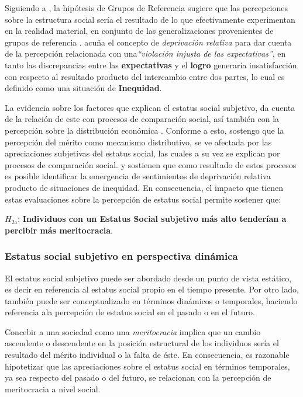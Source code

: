 \documentclass[12pt]{article}
\begin{document}
Siguiendo a \citet{Evans2004}, la hipótesis de Grupos de Referencia sugiere que las percepciones sobre la estructura social sería el resultado de lo que efectivamente experimentan en la realidad material, en conjunto de las generalizaciones provenientes de grupos de referencia \citep{Merton1968}. \cite{Adams1965} acuña el concepto de \textit{deprivación relativa} para dar cuenta de la percepción relacionada con una\textit{“violación injusta de las expectativas”}, en tanto las discrepancias entre las \textbf{expectativas} y el \textbf{logro} generaría insatisfacción con respecto al resultado producto del intercambio entre dos partes, lo cual es definido como una situación de \textbf{Inequidad}. 

La evidencia sobre los factores que explican el estatus social subjetivo, da cuenta de la relación de este con procesos de comparación social, así también con la percepción sobre la distribución económica  \citep{festinger1954theory,Adams1965,Jasso2015}. Conforme a esto, sostengo que la percepción del mérito como mecanismo distributivo, se ve afectada por las apreciaciones subjetivas del estatus social, las cuales a su vez se explican por procesos de comparación social. \citet{Adams1965} y \citet{Merton1968} sostienen que como resultado de estos procesos es posible identificar la emergencia de sentimientos de deprivación relativa producto de situaciones de inequidad. En consecuencia, el impacto que tienen estas evaluaciones sobre la percepción de estatus social permite sostener que:

$H_{\text{2a}}$: \textbf{Individuos con un Estatus Social subjetivo más alto tenderían a percibir más meritocracia}.


\subsubsection*{Estatus social subjetivo en perspectiva dinámica}

El estatus social subjetivo puede ser abordado desde un punto de vista estático, es decir en referencia al estatus social propio en el tiempo presente. Por otro lado, también puede ser conceptualizado en términos dinámicos o temporales, haciendo referencia ala percepción de estatus social en el pasado o en el futuro. 

Concebir a una sociedad como una \emph{meritocracia} implica que un cambio ascendente o descendente en la posición estructural de los individuos sería el resultado del mérito individual o la falta de éste. En consecuencia, es razonable hipotetizar que las apreciaciones sobre el estatus social en términos temporales, ya sea respecto del pasado o del futuro, se relacionan con la percepción de meritocracia a nivel social.      
\end{document}
